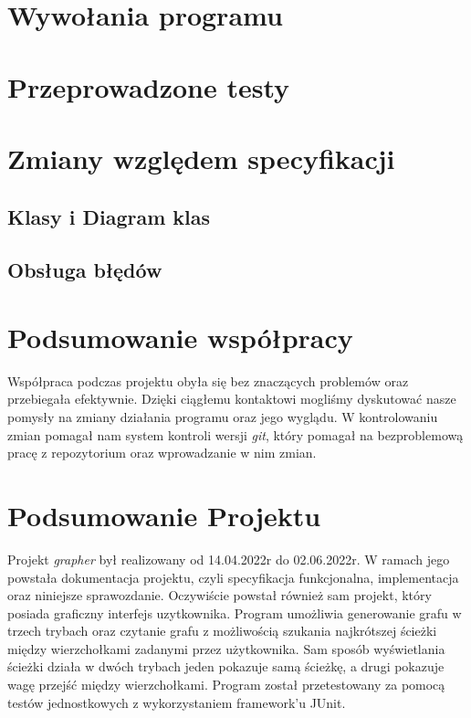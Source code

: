 \documentclass[10pt, a4paper]{report}
\begin{document}
\newpage

\section{Wywołania programu}\label{sec:wywołania-programu}


\section{Przeprowadzone testy}\label{sec:przeprowadzone-testy}


\section{Zmiany względem specyfikacji}\label{sec:zmiany-względem-specyfikacji}

\subsection{Klasy i Diagram klas}\label{subsec:klasy-i-diagram-klas}

\subsection{Obsługa błędów}\label{subsec:obsługa-błędów}


\section{Podsumowanie współpracy}\label{sec:podsumowanie-współpracy}
Współpraca podczas projektu obyła się bez znaczących problemów oraz przebiegała efektywnie.
Dzięki ciągłemu kontaktowi mogliśmy dyskutować nasze pomysły na zmiany działania programu oraz jego wyglądu.
W kontrolowaniu zmian pomagał nam system kontroli wersji \textit{git}, który pomagał na bezproblemową pracę z repozytorium oraz wprowadzanie w nim zmian.

\section{Podsumowanie Projektu}\label{sec:podsumowanie-projektu}
Projekt \textit{grapher} był realizowany od 14.04.2022r do 02.06.2022r. W ramach jego powstała dokumentacja projektu, czyli
specyfikacja funkcjonalna, implementacja oraz niniejsze sprawozdanie. Oczywiście powstał również sam projekt, który posiada graficzny interfejs uzytkownika.
Program umożliwia generowanie grafu w trzech trybach oraz czytanie grafu z możliwością szukania najkrótszej ścieżki między wierzchołkami zadanymi przez użytkownika.
Sam sposób wyświetlania ścieżki działa w dwóch trybach jeden pokazuje samą ścieżkę, a drugi pokazuje wagę przejść między wierzchołkami. Program został przetestowany za pomocą testów
jednostkowych z wykorzystaniem framework'u JUnit.
\end{document}
